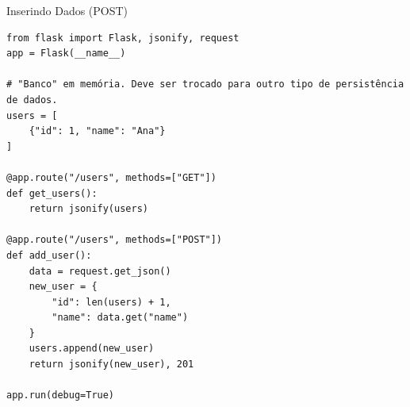 \documentclass{beamer}
\begin{document}
\begin{frame}[fragile]{Inserindo Dados (POST)}

\begin{verbatim}
from flask import Flask, jsonify, request
app = Flask(__name__)

# "Banco" em memória. Deve ser trocado para outro tipo de persistência de dados.
users = [
    {"id": 1, "name": "Ana"}
]

@app.route("/users", methods=["GET"])
def get_users():
    return jsonify(users)

@app.route("/users", methods=["POST"])
def add_user():
    data = request.get_json()
    new_user = {
        "id": len(users) + 1,
        "name": data.get("name")
    }
    users.append(new_user)
    return jsonify(new_user), 201

app.run(debug=True)
\end{verbatim}

\end{frame}
\end{document}
